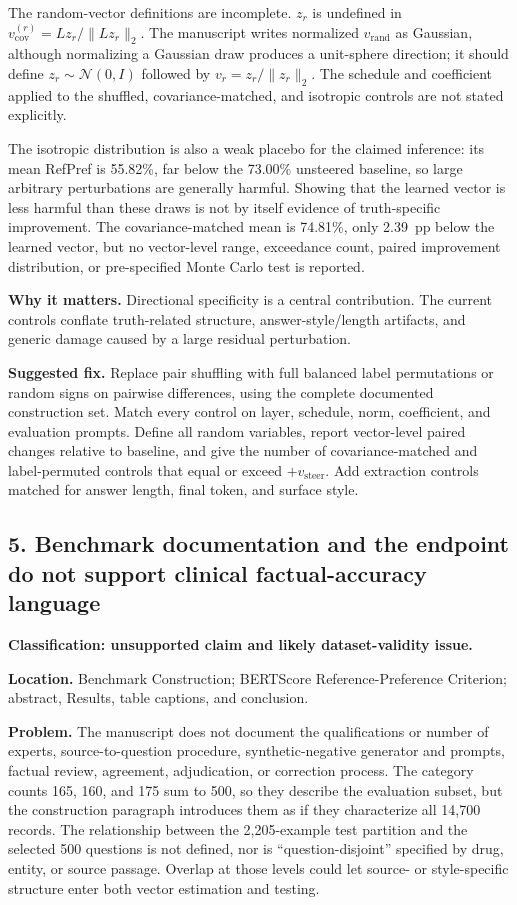 \documentclass[11pt]{article}
\begin{document}
The random-vector definitions are incomplete.  $z_r$ is undefined in $v_{\text{cov}}^{(r)}=Lz_r/\|Lz_r\|_2$.  The manuscript writes normalized $v_{\text{rand}}$ as Gaussian, although normalizing a Gaussian draw produces a unit-sphere direction; it should define $z_r\sim\mathcal N(0,I)$ followed by $v_r=z_r/\|z_r\|_2$.  The schedule and coefficient applied to the shuffled, covariance-matched, and isotropic controls are not stated explicitly.

The isotropic distribution is also a weak placebo for the claimed inference: its mean RefPref is 55.82\%, far below the 73.00\% unsteered baseline, so large arbitrary perturbations are generally harmful.  Showing that the learned vector is less harmful than these draws is not by itself evidence of truth-specific improvement.  The covariance-matched mean is 74.81\%, only 2.39~pp below the learned vector, but no vector-level range, exceedance count, paired improvement distribution, or pre-specified Monte Carlo test is reported.

\textbf{Why it matters.} Directional specificity is a central contribution.  The current controls conflate truth-related structure, answer-style/length artifacts, and generic damage caused by a large residual perturbation.

\textbf{Suggested fix.} Replace pair shuffling with full balanced label permutations or random signs on pairwise differences, using the complete documented construction set.  Match every control on layer, schedule, norm, coefficient, and evaluation prompts.  Define all random variables, report vector-level paired changes relative to baseline, and give the number of covariance-matched and label-permuted controls that equal or exceed $+v_{\text{steer}}$.  Add extraction controls matched for answer length, final token, and surface style.

\subsection*{5. Benchmark documentation and the endpoint do not support clinical factual-accuracy language}

\textbf{Classification: unsupported claim and likely dataset-validity issue.}

\textbf{Location.} Benchmark Construction; BERTScore Reference-Preference Criterion; abstract, Results, table captions, and conclusion.

\textbf{Problem.} The manuscript does not document the qualifications or number of experts, source-to-question procedure, synthetic-negative generator and prompts, factual review, agreement, adjudication, or correction process.  The category counts 165, 160, and 175 sum to 500, so they describe the evaluation subset, but the construction paragraph introduces them as if they characterize all 14,700 records.  The relationship between the 2,205-example test partition and the selected 500 questions is not defined, nor is ``question-disjoint'' specified by drug, entity, or source passage.  Overlap at those levels could let source- or style-specific structure enter both vector estimation and testing.
\end{document}
